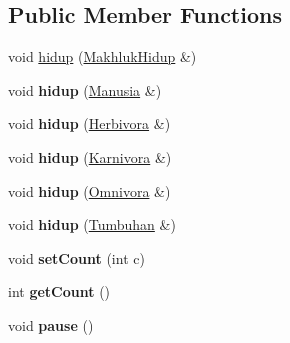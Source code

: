 \subsection*{Public Member Functions}
\begin{DoxyCompactItemize}
\item 
void \hyperlink{class_konduktor_makhluk_hidup_a60166836c3639da40a13b3802c70dc18}{hidup} (\hyperlink{class_makhluk_hidup}{Makhluk\+Hidup} \&)
\item 
void {\bfseries hidup} (\hyperlink{class_manusia}{Manusia} \&)\hypertarget{class_konduktor_makhluk_hidup_a87e20c1fac7f69730e1f800928fdab59}{}\label{class_konduktor_makhluk_hidup_a87e20c1fac7f69730e1f800928fdab59}

\item 
void {\bfseries hidup} (\hyperlink{class_herbivora}{Herbivora} \&)\hypertarget{class_konduktor_makhluk_hidup_a6db50a642d5f184ca11aaeb6e275797f}{}\label{class_konduktor_makhluk_hidup_a6db50a642d5f184ca11aaeb6e275797f}

\item 
void {\bfseries hidup} (\hyperlink{class_karnivora}{Karnivora} \&)\hypertarget{class_konduktor_makhluk_hidup_a46e2bf54054641c6c8b377ef4052da39}{}\label{class_konduktor_makhluk_hidup_a46e2bf54054641c6c8b377ef4052da39}

\item 
void {\bfseries hidup} (\hyperlink{class_omnivora}{Omnivora} \&)\hypertarget{class_konduktor_makhluk_hidup_a54ce9beb02fffa0320fd8f8a1315e255}{}\label{class_konduktor_makhluk_hidup_a54ce9beb02fffa0320fd8f8a1315e255}

\item 
void {\bfseries hidup} (\hyperlink{class_tumbuhan}{Tumbuhan} \&)\hypertarget{class_konduktor_makhluk_hidup_a247cde5e3f3e8bf9ffa015b90e29fe38}{}\label{class_konduktor_makhluk_hidup_a247cde5e3f3e8bf9ffa015b90e29fe38}

\item 
void {\bfseries set\+Count} (int c)\hypertarget{class_konduktor_makhluk_hidup_aa354f1666205cd60c3769e33e7d797ba}{}\label{class_konduktor_makhluk_hidup_aa354f1666205cd60c3769e33e7d797ba}

\item 
int {\bfseries get\+Count} ()\hypertarget{class_konduktor_makhluk_hidup_ac404a4378cbd21ddc557ffd0496c322d}{}\label{class_konduktor_makhluk_hidup_ac404a4378cbd21ddc557ffd0496c322d}

\item 
void {\bfseries pause} ()\hypertarget{class_konduktor_makhluk_hidup_a90086da731ab404c57c96db90d6bb968}{}\label{class_konduktor_makhluk_hidup_a90086da731ab404c57c96db90d6bb968}


\end{DoxyCompactItemize}
